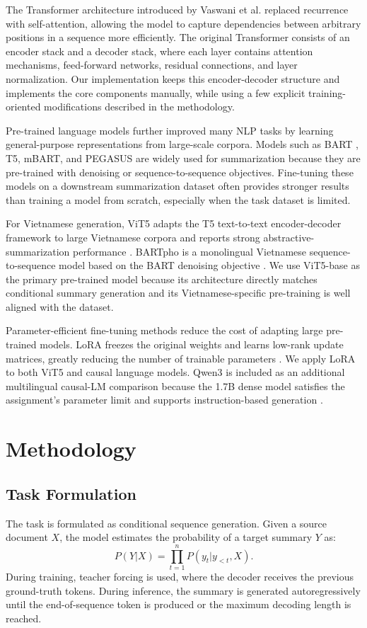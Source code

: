 \documentclass[conference]{IEEEtran}
\begin{document}
The Transformer architecture introduced by Vaswani et al. replaced recurrence with self-attention, allowing the model to capture dependencies between arbitrary positions in a sequence more efficiently. The original Transformer consists of an encoder stack and a decoder stack, where each layer contains attention mechanisms, feed-forward networks, residual connections, and layer normalization. Our implementation keeps this encoder-decoder structure and implements the core components manually, while using a few explicit training-oriented modifications described in the methodology.

Pre-trained language models further improved many NLP tasks by learning general-purpose representations from large-scale corpora. Models such as BART \cite{lewis2020bart}, T5, mBART, and PEGASUS \cite{zhang2020pegasus} are widely used for summarization because they are pre-trained with denoising or sequence-to-sequence objectives. Fine-tuning these models on a downstream summarization dataset often provides stronger results than training a model from scratch, especially when the task dataset is limited.

For Vietnamese generation, ViT5 adapts the T5 text-to-text encoder-decoder framework to large Vietnamese corpora and reports strong abstractive-summarization performance \cite{phan2022vit5}. BARTpho is a monolingual Vietnamese sequence-to-sequence model based on the BART denoising objective \cite{tran2022bartpho}. We use ViT5-base as the primary pre-trained model because its architecture directly matches conditional summary generation and its Vietnamese-specific pre-training is well aligned with the dataset.

Parameter-efficient fine-tuning methods reduce the cost of adapting large pre-trained models. LoRA freezes the original weights and learns low-rank update matrices, greatly reducing the number of trainable parameters \cite{hu2022lora}. We apply LoRA to both ViT5 and causal language models. Qwen3 is included as an additional multilingual causal-LM comparison because the 1.7B dense model satisfies the assignment's parameter limit and supports instruction-based generation \cite{yang2025qwen3}.

\section{Methodology}

\subsection{Task Formulation}
The task is formulated as conditional sequence generation. Given a source document $X$, the model estimates the probability of a target summary $Y$ as:
\begin{equation}
P(Y|X) = \prod_{t=1}^{n} P(y_t | y_{<t}, X).
\end{equation}
During training, teacher forcing is used, where the decoder receives the previous ground-truth tokens. During inference, the summary is generated autoregressively until the end-of-sequence token is produced or the maximum decoding length is reached.
\end{document}

